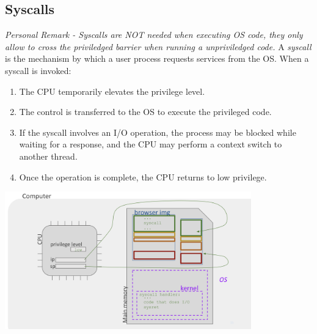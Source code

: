 \documentclass[../../compsys.tex]{subfiles}
\begin{document}
\subsection{Syscalls}
\textit{Personal Remark - Syscalls are NOT needed when executing OS code, they only allow to cross the priviledged barrier when running a unpriviledged code.}
A \emph{syscall} is the mechanism by which a user process requests services from the OS. When a syscall is invoked:
\begin{enumerate}
  \item The CPU temporarily elevates the privilege level.
  \item The control is transferred to the OS to execute the privileged code.
  \item If the syscall involves an I/O operation, the process may be blocked while waiting for a response, and the CPU may perform a context switch to another thread.
  \item Once the operation is complete, the CPU returns to low privilege.
\end{enumerate}

\begin{center}
  \includegraphics[width=0.8\textwidth]{chapters/L3/images/parallel-syscall.png}
\end{center}
\newpage
\end{document}
